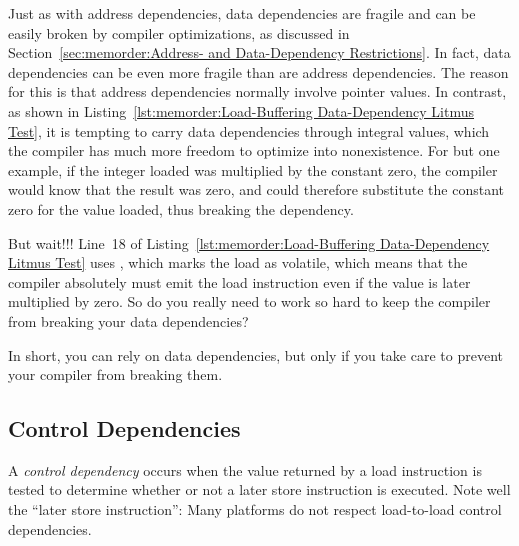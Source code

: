 Just as with address dependencies, data dependencies are
fragile and can be easily broken by compiler optimizations, as discussed in
Section~\ref{sec:memorder:Address- and Data-Dependency Restrictions}.
In fact, data dependencies can be even more fragile than are address
dependencies.
The reason for this is that address dependencies normally involve
pointer values.
In contrast, as shown in
Listing~\ref{lst:memorder:Load-Buffering Data-Dependency Litmus Test},
it is tempting to carry data dependencies through integral values,
which the compiler has much more freedom to optimize into nonexistence.
For but one example, if the integer loaded was multiplied by the constant
zero, the compiler would know that the result was zero, and could therefore
substitute the constant zero for the value loaded, thus breaking
the dependency.

\QuickQuiz{}
	But wait!!!
	Line~18 of
	Listing~\ref{lst:memorder:Load-Buffering Data-Dependency Litmus Test}
	uses , which marks the load as volatile,
	which means that the compiler absolutely must emit the load
	instruction even if the value is later multiplied by zero.
	So do you really need to work so hard to keep the compiler from
	breaking your data dependencies?
 \QuickQuizEnd

In short, you can rely on data dependencies, but only if you take care
to prevent your compiler from breaking them.

\subsection{Control Dependencies}
\label{sec:memorder:Control Dependencies}

A \emph{control dependency} occurs when the value returned by a load
instruction is tested to determine whether or not a later store instruction
is executed.
Note well the ``later store instruction'': Many platforms do not respect
load-to-load control dependencies.

